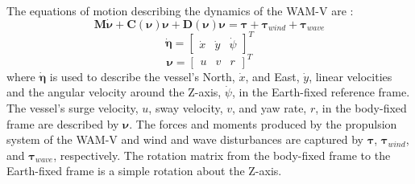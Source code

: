 \documentclass[letterpaper, 10 pt, conference]{ieeeconf}  %
\begin{document}
The equations of motion describing the dynamics of the WAM-V are \cite{Fossen:11c}:
%
\begin{equation}
\bm{M}\dot{\bm{\nu}} + \bm{C}(\bm{\nu})\bm{\nu} + \bm{D}(\bm{\nu})\bm{\nu} = \bm{\tau} + \bm{\tau}_{wind} + \bm{\tau}_{wave}
\end{equation}
%
\begin{equation}
\dot{\bm{\eta}} =
\left[
\begin{matrix}
\dot{x} & \dot{y} & \dot\psi
\end{matrix}
\right]^T
\end{equation}
%
\begin{equation}
\bm{\nu} = \left[
\begin{matrix}
u & v & r
\end{matrix}
\right]^T
\end{equation}
%
where $\dot{\bm{\eta}}$ is used to describe the vessel's North, $\dot{x}$, and East, $\dot{y}$, linear velocities and the angular velocity around the Z-axis, $\dot{\psi}$, in the Earth-fixed reference frame. The vessel's surge velocity, $u$, sway velocity, $v$, and yaw rate, $r$, in the body-fixed frame are described by $\bm{\nu}$. The forces and moments produced by the propulsion system of the WAM-V and wind and wave disturbances are captured by $\bm{\tau}$, $\bm{\tau}_{wind}$, and $\bm{\tau}_{wave}$, respectively. The rotation matrix from the body-fixed frame to the Earth-fixed frame is a simple rotation about the Z-axis.
\end{document}

